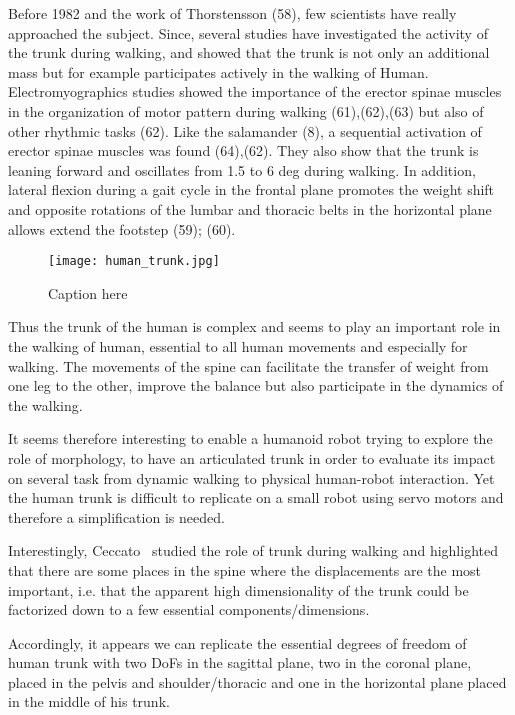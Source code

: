 Before 1982 and the work of Thorstensson (58), few scientists have really approached the subject. Since, several studies have investigated the activity of the trunk during walking, and showed that the trunk is not only an additional mass but for example participates actively in the walking of Human.
Electromyographics studies showed the importance of the erector spinae muscles in the organization of motor pattern during walking (61),(62),(63) but also of other rhythmic tasks (62). Like the salamander (8), a sequential activation of erector spinae muscles was found (64),(62).
They also show that the trunk is leaning forward and oscillates from 1.5 to 6 deg during walking. In addition, lateral flexion during a gait cycle in the frontal plane promotes the weight shift and opposite rotations of the lumbar and thoracic belts in the horizontal plane allows extend the footstep (59); (60).

\begin{figure}[h]
    \begin{center}
        \texttt{[image: human\_trunk.jpg]}
    \end{center}
    \caption{Caption here}
    \label{fig:human_spine_system}
\end{figure}

Thus the trunk of the human is complex and seems to play an important role in the walking of human, essential to all human movements and especially for walking. The movements of the spine can facilitate the transfer of weight from one leg to the other, improve the balance but also participate in the dynamics of the walking.

It seems therefore interesting to enable a humanoid robot trying to explore the role of morphology, to have an articulated trunk in order to evaluate its impact on several task from dynamic walking to physical human-robot interaction. Yet the human trunk is difficult to replicate on a small robot using servo motors and therefore a simplification is needed.

Interestingly, Ceccato~\parencite{ceccatoPlos09} studied the role of trunk during walking and highlighted that there are some places in the spine where the displacements are the most important, i.e. that the apparent high dimensionality of the trunk could be factorized down to a few essential components/dimensions.

Accordingly, it appears we can replicate the essential degrees of freedom of human trunk with two DoFs in the sagittal plane, two in the coronal plane, placed in the pelvis and shoulder/thoracic and one in the horizontal plane placed in the middle of his trunk.

